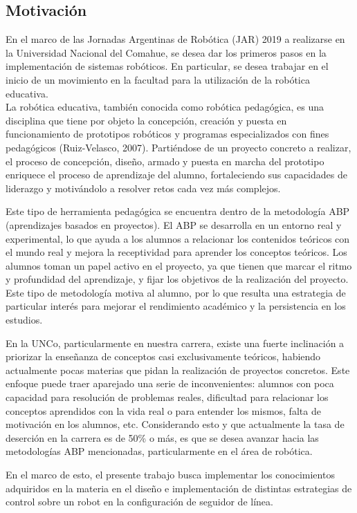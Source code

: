 \documentclass[10pt,conference,a4paper,onecolumn]{article}%
\begin{document}
\subsection{Motivación}
\label{sec:motivacion}
En el marco de las Jornadas Argentinas de Robótica (JAR) 2019 a realizarse en la Universidad Nacional del Comahue, se desea dar los primeros pasos en la implementación de sistemas robóticos. En particular, se desea trabajar en el inicio de un movimiento en la facultad para la utilización de la robótica educativa. \\
La robótica educativa, también conocida como robótica pedagógica, es una disciplina que tiene por objeto la concepción, creación y puesta en funcionamiento de prototipos robóticos y programas especializados con fines pedagógicos (Ruiz-Velasco, 2007). Partiéndose de un proyecto concreto a realizar, el proceso de concepción, diseño, armado y puesta en marcha del prototipo enriquece el proceso de aprendizaje del alumno, fortaleciendo sus capacidades de liderazgo y motivándolo a resolver retos cada vez más
complejos.

Este tipo de herramienta pedagógica se encuentra dentro de la metodología ABP (aprendizajes basados en proyectos). El ABP se desarrolla en un entorno real y experimental, lo que ayuda a los alumnos a relacionar los contenidos teóricos con el mundo real y mejora la receptividad para aprender los conceptos teóricos. Los alumnos toman un papel activo en el proyecto, ya que tienen que marcar el ritmo y profundidad del aprendizaje, y fijar los objetivos de la realización del proyecto. Este tipo de metodología motiva al alumno, por lo que resulta una estrategia de particular interés para mejorar el rendimiento académico y la persistencia
en los estudios.

En la UNCo, particularmente en nuestra carrera, existe una fuerte inclinación a priorizar la enseñanza de conceptos casi exclusivamente teóricos, habiendo actualmente pocas materias que pidan la realización de proyectos concretos. Este enfoque puede traer aparejado una serie de inconvenientes: alumnos con poca capacidad para resolución de problemas reales, dificultad para relacionar los conceptos aprendidos con la vida real o para entender los mismos, falta de motivación en los alumnos, etc. Considerando esto y que actualmente la tasa de deserción en la carrera es de 50\% o más, es que se desea avanzar hacia las metodologías
ABP mencionadas, particularmente en el área de robótica. 

En el marco de esto, el presente trabajo busca implementar los conocimientos adquiridos en la materia en el diseño e implementación de distintas estrategias de control sobre un robot en la configuración de seguidor de línea.
\end{document}
